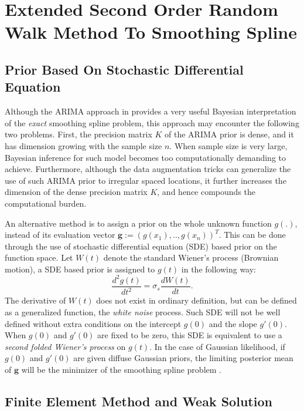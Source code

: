 \documentclass{article}
\begin{document}
\section{Extended Second Order Random Walk Method To Smoothing Spline}\label{rw2}

\subsection{Prior Based On Stochastic Differential Equation}\label{SDEprior}


Although the ARIMA approach in \cite{ARIMA} provides a very useful Bayesian interpretation of the \textit{exact} smoothing spline problem, this approach may encounter the following two problems.
First, the precision matrix $K$ of the ARIMA prior is dense, and it has dimension growing with the sample size $n$. When sample size is very large, Bayesian inference for such model becomes too computationally demanding to achieve.
Furthermore, although the data augmentation tricks can generalize the use of such ARIMA prior to irregular spaced locations, it further increases the dimension of the dense precision matrix $K$, and hence compounds the computational burden.

An alternative method is to assign a prior on the whole unknown function $g(.)$, instead of its evaluation vector $\boldsymbol g :=(g(x_1),..,g(x_n))^T$. This can be done through the use of stochastic differential equation (SDE) based prior on the function space. Let $W(t)$ denote the standard Wiener's process (Brownian motion), a SDE based prior is assigned to $g(t)$ in the following way:
$$\frac{d^2g(t)}{dt^2} = \sigma_s\frac{dW(t)}{dt}.$$ 
The derivative of $W(t)$ does not exist in ordinary definition, but can be defined as a generalized function, the \textit{white noise} process. Such SDE will not be well defined without extra conditions on the intercept $g(0)$ and the 
slope $g'(0)$. When $g(0)$ and $g'(0)$ are fixed to be zero, this SDE is equivalent to use a \textit{second folded Wiener's process} on $g(t)$. In the case of Gaussian likelihood, if $g(0)$ and $g'(0)$ are given diffuse Gaussian priors, the limiting posterior mean of $\boldsymbol g$ will be the minimizer of the smoothing spline problem \citep{wahba}.


\subsection{Finite Element Method and Weak Solution}
\end{document}
